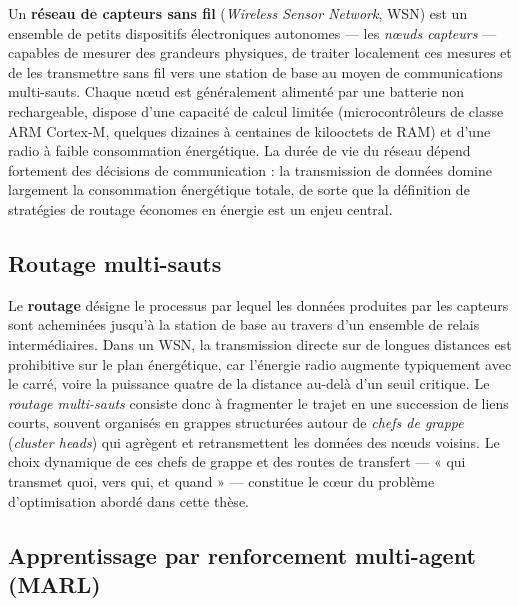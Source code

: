 Un \textbf{réseau de capteurs sans fil} (\emph{Wireless Sensor Network}, WSN) est un ensemble de petits dispositifs électroniques autonomes — les \emph{nœuds capteurs} — capables de mesurer des grandeurs physiques, de traiter localement ces mesures et de les transmettre sans fil vers une station de base au moyen de communications multi-sauts\cite{chong2003sensor,yarali_wireless_2020}. Chaque nœud est généralement alimenté par une batterie non rechargeable, dispose d'une capacité de calcul limitée (microcontrôleurs de classe ARM Cortex-M, quelques dizaines à centaines de kilooctets de RAM) et d'une radio à faible consommation énergétique\cite{yarali_wireless_2020,dietrich2009lifetime}. La durée de vie du réseau dépend fortement des décisions de communication : la transmission de données domine largement la consommation énergétique totale, de sorte que la définition de stratégies de routage économes en énergie est un enjeu central\cite{heinzelman2000leach,dietrich2009lifetime}.

\subsection*{Routage multi-sauts}

Le \textbf{routage} désigne le processus par lequel les données produites par les capteurs sont acheminées jusqu'à la station de base au travers d'un ensemble de relais intermédiaires. Dans un WSN, la transmission directe sur de longues distances est prohibitive sur le plan énergétique, car l'énergie radio augmente typiquement avec le carré, voire la puissance quatre de la distance au-delà d'un seuil critique\cite{heinzelman2000leach,heinzelman2002leach}. Le \emph{routage multi-sauts} consiste donc à fragmenter le trajet en une succession de liens courts, souvent organisés en grappes structurées autour de \emph{chefs de grappe} (\emph{cluster heads}) qui agrègent et retransmettent les données des nœuds voisins\cite{younis2004heed,chong2003sensor}. Le choix dynamique de ces chefs de grappe et des routes de transfert — « qui transmet quoi, vers qui, et quand » — constitue le cœur du problème d'optimisation abordé dans cette thèse\cite{metaheuristic_wsn_slr2026,chaurasia_mocraw_2023}.

\subsection*{Apprentissage par renforcement multi-agent (MARL)}

